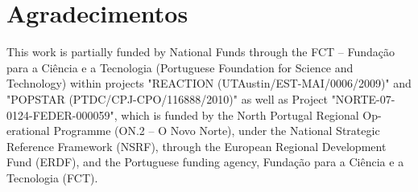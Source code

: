 \chapter*{Agradecimentos}




\vfill

This work is partially funded by National Funds through the FCT – Fundação para a Ciência e a Tecnologia (Portuguese Foundation for Science and Technology) within projects "REACTION (UTAustin/EST-MAI/0006/2009)" and "POPSTAR (PTDC/CPJ-CPO/116888/2010)" as well as Project "NORTE-07-0124-FEDER-000059", which is funded by the North Portugal Regional Op- erational Programme (ON.2 – O Novo Norte), under the National Strategic Reference Framework (NSRF), through the European Regional Development Fund (ERDF), and the Portuguese funding agency, Fundação para a Ciência e a Tecnologia (FCT). 